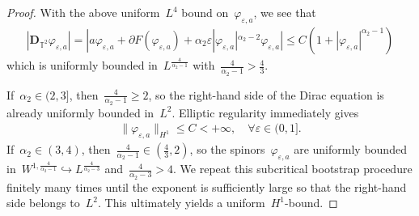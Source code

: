 \documentclass[11pt,final]{amsart}
\newcommand{\p}{\partial}
\newcommand{\T}{\mathbb{T}}
\newcommand{\eps}{\varepsilon}
\newcommand{\pD}{\mathbf{D}}
\newcommand{\parenthesis}[1]{\left(#1\right)} %
\begin{document}
\begin{proof}
With the above uniform~$L^4$ bound on~$\varphi_{\eps,a}$, we see that 
    \begin{align}
        |\pD_{\T^2}\varphi_{\eps,a}|
        =|a\varphi_{\eps,a} + \p F(\varphi_{\eps,a})+ \alpha_2\eps|\varphi_{\eps,a}|^{\alpha_2-2}\varphi_{\eps,a} |
        \leq
        C\parenthesis{ 1+ |\varphi_{\eps,a}|^{\alpha_2 -1}}
    \end{align}
    which is uniformly bounded in~$L^{\frac{4}{\alpha_2 -1 }}$ with~$\frac{4}{\alpha_2 -1}>\frac{4}{3}$.

    If~$\alpha_2\in (2,3]$, then~$\frac{4}{\alpha_2-1}\geq 2$, so the right-hand side of the Dirac equation is already uniformly bounded in~$L^2$. 
    Elliptic regularity immediately gives
    \begin{align}
        \|\varphi_{\eps,a}\|_{H^1}\leq C<+\infty, \quad \forall \eps\in (0,1].
    \end{align}
    If~$\alpha_2\in (3,4)$, then~$\frac{4}{\alpha_2-1}\in (\frac{4}{3},2)$, so the spinors~$\varphi_{\eps,a} $ are uniformly bounded in~$W^{1,\frac{4}{\alpha_2-1}} \hookrightarrow L^{\frac{4}{\alpha_2-3}}$ and~$\frac{4}{\alpha_2-3}>4$.
    We repeat this subcritical bootstrap procedure finitely many times until the exponent is sufficiently large so that the right-hand side belongs to~$L^2$. This ultimately yields a uniform~$H^1$-bound.

\end{proof}
\end{document}
